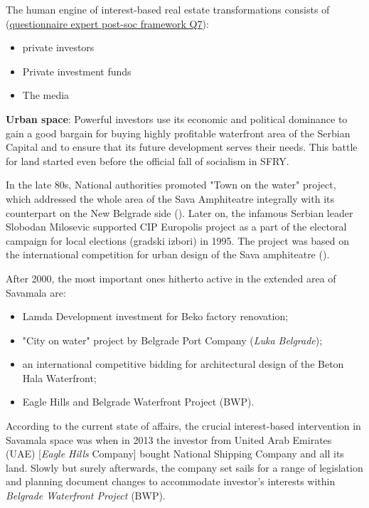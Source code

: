 \documentclass[11pt]{report}
\begin{document}
\begin{itemize}
The human engine of interest-based real estate transformations consists of (\href{}{questionnaire expert post-soc framework Q7}):

\begin{itemize}
\item private investors
\item Private investment funds
\item The media
\end{itemize}

\textbf{Urban space}:
Powerful investors use its economic and political dominance to gain a good bargain for buying highly profitable waterfront area of the Serbian Capital and to ensure that its future development serves their needs. This battle for land started even before the official fall of socialism in SFRY.

In the late 80s, National authorities promoted "Town on the water" project, which addressed the whole area of the Sava Amphiteatre integrally with its counterpart on the New Belgrade side (\cite{Program Savskkog amfiteatra 1}).
Later on, the infamous Serbian leader Slobodan Milosevic supported CIP Europolis project as a part of the electoral campaign for local elections (gradski izbori) in 1995.
The project was based on the international competition for urban design of the Sava amphiteatre (\cite{Program Savskkog amfiteatra 1}).

After 2000, the most important ones hitherto active in the extended area of Savamala are:

\begin{itemize}
\item Lamda Development investment for Beko factory renovation;
\item "City on water" project by Belgrade Port Company (\textit{Luka Belgrade});
\item an international competitive bidding for architectural design of the Beton Hala Waterfront;
\item Eagle Hills and Belgrade Waterfront Project (BWP).
\end{itemize}

According to the current state of affairs, the crucial interest-based intervention in Savamala space was when in 2013 the investor from United Arab Emirates (UAE) [\textit{Eagle Hills} Company] bought National Shipping Company and all its land. Slowly but surely afterwards, the company set sails for a range of legislation and planning document changes to accommodate investor's interests within \textit{Belgrade Waterfront Project} (BWP).


\end{itemize}
\end{document}
